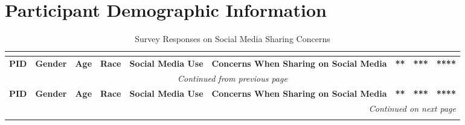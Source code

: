 \section{Participant Demographic Information}
\label{ref:individual-demographics}
\begin{longtable}{l p{1cm} p{0.5cm} p{0.8cm} p{2.5cm} p{7.3cm} r r r}
\caption{Survey Responses on Social Media Sharing Concerns} \\
\label{tab:demographics-individual} \\
\toprule
 \textbf{PID} & \textbf{Gender} & \textbf{Age} & \textbf{Race} & \textbf{Social Media Use} & \textbf{Concerns When Sharing on Social Media} & \textbf{**} & \textbf{***} & \textbf{****} \\
\midrule
\endfirsthead

\multicolumn{9}{c}{{\textit{Continued from previous page}}} \\
\toprule
 \textbf{PID} & \textbf{Gender} & \textbf{Age} & \textbf{Race} & \textbf{Social Media Use} & \textbf{Concerns When Sharing on Social Media} & \textbf{**} & \textbf{***} & \textbf{****} \\
\midrule
\endhead

\bottomrule
\multicolumn{9}{r}{{\textit{Continued on next page}}} \\
\endfoot

\bottomrule
\endlastfoot


\end{longtable}
